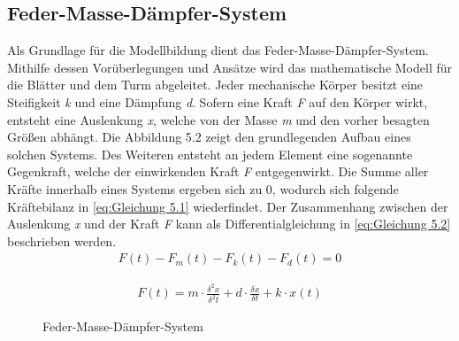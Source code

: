 \subsection{Feder-Masse-Dämpfer-System}
Als Grundlage für die Modellbildung dient das Feder-Masse-Dämpfer-System. Mithilfe dessen Vorüberlegungen und Ansätze wird das mathematische Modell für die Blätter und dem Turm abgeleitet. Jeder mechanische Körper besitzt eine Steifigkeit \textit{k} und eine Dämpfung \textit{d}. Sofern eine Kraft \textit{F} auf den Körper wirkt, entsteht eine Auslenkung \textit{x}, welche von der Masse \textit{m} und den vorher besagten Größen abhängt. Die Abbildung 5.2 zeigt den grundlegenden Aufbau eines solchen Systems.
Des Weiteren entsteht an jedem Element eine sogenannte Gegenkraft, welche der einwirkenden Kraft \textit{F} entgegenwirkt. Die Summe aller Kräfte innerhalb eines Systems ergeben sich zu 0, wodurch sich folgende Kräftebilanz in \autoref{eq:Gleichung 5.1} wiederfindet. Der Zusammenhang zwischen der Auslenkung \textit{x} und der Kraft \textit{F} kann als Differentialgleichung in \autoref{eq:Gleichung 5.2} beschrieben werden.
\begin{align}
    F(t) - F_{m}(t) - F_{k}(t) - F_{d}(t) = 0 
    \label{eq:Gleichung 5.1}
\end{align}

\begin{align}
    F(t) = m \cdot \frac{\delta^2x}{\delta^2t} + d \cdot \frac{\delta x}{\delta t} + k \cdot x(t)
    \label{eq:Gleichung 5.2}
\end{align}
\begin{figure}[H]
\centering
{}
\caption{Feder-Masse-Dämpfer-System}
\label{fig:FederMasseDämpferSystem}
\end{figure}
\newpage
